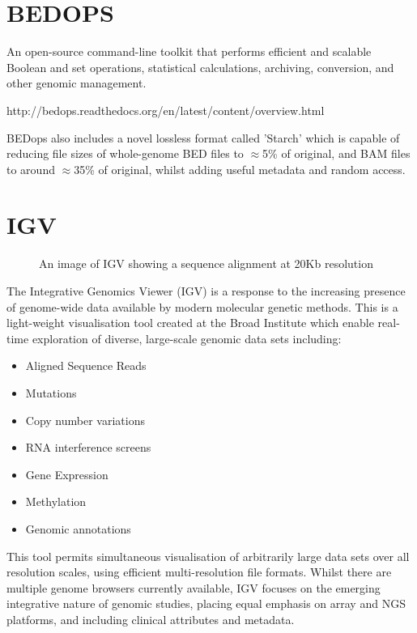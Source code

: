 \documentclass[12pt]{report}
\begin{document}
\section*{BEDOPS}
An open-source command-line toolkit that performs efficient and scalable Boolean and set operations, statistical calculations, archiving, conversion, and other genomic management.

http://bedops.readthedocs.org/en/latest/content/overview.html

BEDops also includes a novel lossless format called 'Starch' which is capable of reducing file sizes of whole-genome BED files to $\approx$5\% of original, and BAM files to around $\approx$35\% of original, whilst adding useful metadata and random access. 

\section*{IGV}
\begin{figure}[ht]
	\centering
	\caption{An image of IGV showing a sequence alignment at 20Kb resolution}\label{IGV}
\end{figure}

The Integrative Genomics Viewer (IGV) is a response to the increasing presence of genome-wide data available by modern molecular genetic methods. This is a light-weight visualisation tool created at the Broad Institute which enable real-time exploration of diverse, large-scale genomic data sets including:

\begin{itemize}
	\item Aligned Sequence Reads
	\item Mutations
	\item Copy number variations
	\item RNA interference screens
	\item Gene Expression
	\item Methylation
	\item Genomic annotations
\end{itemize}
This tool permits simultaneous visualisation of arbitrarily large data sets over all resolution scales, using efficient multi-resolution file formats. Whilst there are multiple genome browsers currently available, IGV focuses on the emerging integrative nature of genomic studies, placing equal emphasis on array and NGS platforms, and including clinical attributes and metadata.
\end{document}
